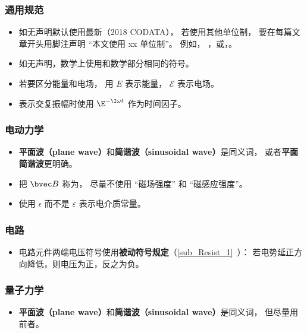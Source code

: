 \subsubsection{通用规范}
\begin{itemize}
\item 如无声明默认使用最新（2018 CODATA）， 若使用其他单位制， 要在每篇文章开头用脚注声明 “本文使用 xx 单位制”。 例如， ，或，。
\item 如无声明，数学上使用和数学部分相同的符号。
\item 若要区分能量和电场， 用 $E$ 表示能量， $\mathcal E$ 表示电场。
\item 表示交复振幅时使用 $\E^{-\I \omega t}$ 作为时间因子。
\end{itemize}

\subsubsection{电动力学}
\begin{itemize}
\item \textbf{平面波（plane wave）}和\textbf{简谐波（sinusoidal wave）}是同义词， 或者\textbf{平面简谐波}更明确。
\item 把 $\bvec B$ 称为， 尽量不使用 “磁场强度” 和 “磁感应强度”。
\item 使用 $\epsilon$ 而不是 $\varepsilon$ 表示电介质常量。
\end{itemize}

\subsubsection{电路}
\begin{itemize}
\item 电路元件两端电压符号使用\textbf{被动符号规定}（\autoref{sub_Resist_1}~）： 若电势延正方向降低，则电压为正，反之为负。
\end{itemize}

\subsubsection{量子力学}
\begin{itemize}
\item \textbf{平面波（plane wave）}和\textbf{简谐波（sinusoidal wave）}是同义词， 但尽量用前者。
\end{itemize}

